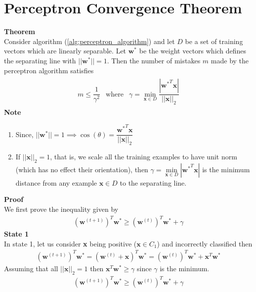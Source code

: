 \section{Perceptron Convergence Theorem}
\textbf{Theorem}\\
Consider algorithm (\ref{alg:perceptron_algorithm}) and let $D$ be a set of training vectors which are linearly separable. Let $\textbf{w}^{*}$ be the weight vectors which defines the separating line with $||\textbf{w}^{*}|| = 1$. Then the number of mistakes $m$ made by the perceptron algorithm satisfies 
\begin{align}
  \begin{matrix}
    m \leq \dfrac{1}{\gamma^2} & \text{where} & \gamma = \underset{\textbf{x}\in D}{\min} \dfrac{|{\textbf{w}^*}^T\textbf{x}|}{||\textbf{x}||_2}
  \end{matrix}
\end{align}
\textbf{Note}
\begin{enumerate}
  \item Since, $||\textbf{w}^{*}|| = 1 \implies \cos (\theta) = \dfrac{{\textbf{w}^*}^T\textbf{x}}{||\textbf{x}||_2}$
  \item If $||\textbf{x}||_2 = 1$, that is, we scale all the training examples to have unit norm (which has no effect their orientation), then $\gamma = \underset{\textbf{x}\in D}{\min} |{\textbf{w}^*}^T\textbf{x}|$ is the minimum distance from any example $\textbf{x} \in D$ to the separating line.
\end{enumerate}
\textbf{Proof}\\
We first prove the inequality given by 
\begin{align}
  (\textbf{w}^ {(t+1)})^T\textbf{w}^{*} \geq (\textbf{w}^ {(t)})^T\textbf{w}^{*} + \gamma
  \label{eq:per_cov_ine_1}
\end{align}
\indent \textbf{State 1} \\
In state 1, let us consider \textbf{x} being positive ($\textbf{x} \in C_1$) and incorrectly classified then
\begin{align}
  \nonumber
  (\textbf{w}^ {(t+1)})^T\textbf{w}^{*} = (\textbf{w}^ {(t)} + \textbf{x})^T\textbf{w}^{*} =   (\textbf{w}^ {(t)})^T\textbf{w}^{*} + \textbf{x}^T\textbf{w}^{*}
\end{align}
Assuming that all $||\textbf{x}||_2 = 1$ then $\textbf{x}^T\textbf{w}^{*} \geq \gamma$ since $\gamma$ is the minimum. 
\begin{align}
  \label{eq:per_cov_ine_2}
  (\textbf{w}^ {(t+1)})^T\textbf{w}^{*} \geq (\textbf{w}^ {(t)})^T\textbf{w}^{*} + \gamma
\end{align}

